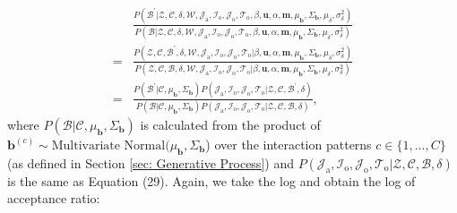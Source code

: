 \documentclass[a4paper]{article}
\begin{document}
   \begin{equation}
   \begin{aligned}
   & \frac{P(\mathcal{B}^\prime|\mathcal{Z},   \mathcal{C},  \delta, \mathcal{W}, \mathcal{J}_{\mbox{a}}, \mathcal{I}_{\mbox{o}}, \mathcal{J}_{\mbox{o}}, \mathcal{T}_{\mbox{o}}, \beta, \boldsymbol{u}, \alpha, \boldsymbol{m}, \mu_{\boldsymbol{b}}, \Sigma_{\boldsymbol{b}}, \mu_\delta, \sigma^2_\delta)}{P(\mathcal{B}|\mathcal{Z},   \mathcal{C}, \delta, \mathcal{W}, \mathcal{J}_{\mbox{a}},\mathcal{I}_{\mbox{o}}, \mathcal{J}_{\mbox{o}}, \mathcal{T}_{\mbox{o}}, \beta, \boldsymbol{u}, \alpha, \boldsymbol{m}, \mu_{\boldsymbol{b}}, \Sigma_{\boldsymbol{b}}, \mu_\delta, \sigma^2_\delta)}\\=&\frac{P(\mathcal{Z}, \mathcal{C}, \mathcal{B}^\prime, \delta, \mathcal{W},  \mathcal{J}_{\mbox{a}}, \mathcal{I}_{\mbox{o}}, \mathcal{J}_{\mbox{o}}, \mathcal{T}_{\mbox{o}} |\beta, \boldsymbol{u}, \alpha, \boldsymbol{m}, \mu_{\boldsymbol{b}}, \Sigma_{\boldsymbol{b}}, \mu_\delta, \sigma^2_\delta)}{P(\mathcal{Z}, \mathcal{C}, \mathcal{B}, \delta, \mathcal{W}, \mathcal{J}_{\mbox{a}}, \mathcal{I}_{\mbox{o}}, \mathcal{J}_{\mbox{o}}, \mathcal{T}_{\mbox{o}} |\beta, \boldsymbol{u}, \alpha, \boldsymbol{m}, \mu_{\boldsymbol{b}}, \Sigma_{\boldsymbol{b}}, \mu_\delta, \sigma^2_\delta)}\\=&\frac{P(\mathcal{B}^\prime|\mathcal{C}, \mu_{\boldsymbol{b}}, \Sigma_{\boldsymbol{b}})P(\mathcal{J}_{\mbox{a}}, \mathcal{I}_{\mbox{o}}, \mathcal{J}_{\mbox{o}}, \mathcal{T}_{\mbox{o}} |\mathcal{Z}, \mathcal{C}, \mathcal{B}^\prime, \delta)}{P(\mathcal{B}|\mathcal{C}, \mu_{\boldsymbol{b}}, \Sigma_{\boldsymbol{b}})P(\mathcal{J}_{\mbox{a}}, \mathcal{I}_{\mbox{o}}, \mathcal{J}_{\mbox{o}}, \mathcal{T}_{\mbox{o}} |\mathcal{Z}, \mathcal{C}, \mathcal{B}, \delta)},
   \end{aligned}
   \end{equation}
   where $P(\mathcal{B}|\mathcal{C}, \mu_{\boldsymbol{b}}, \Sigma_{\boldsymbol{b}})$ is calculated from the product of $\boldsymbol{b}^{(c)}\sim \mbox{Multivariate Normal}(\mu_{\boldsymbol{b}}, \Sigma_{\boldsymbol{b}}$) over the interaction patterns $c \in \{1,...,C\}$ (as defined in Section \ref{sec: Generative Process}) and $P(\mathcal{J}_{\mbox{a}}, \mathcal{I}_{\mbox{o}}, \mathcal{J}_{\mbox{o}}, \mathcal{T}_{\mbox{o}} |\mathcal{Z}, \mathcal{C}, \mathcal{B}, \delta)$ is the same as Equation (29). Again, we take the log and obtain the log of acceptance ratio:
\end{document}
